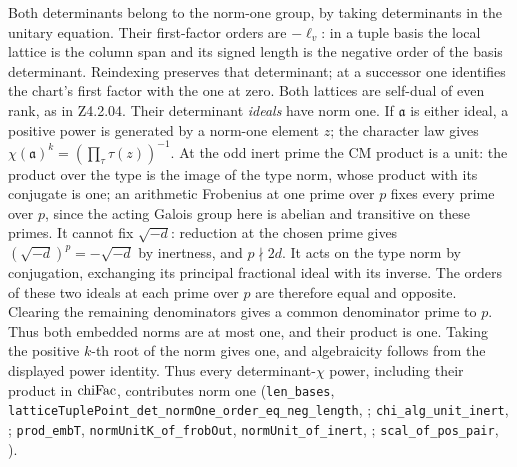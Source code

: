 Both determinants belong to the norm-one group, by taking determinants in the unitary equation. Their first-factor orders are \(-\ell_v\): in a tuple basis the local lattice is the column span and its signed length is the negative order of the basis determinant. Reindexing preserves that determinant; at a successor one identifies the chart's first factor with the one at zero. Both lattices are self-dual of even rank, as in Z4.2.04. Their determinant \emph{ideals} have norm one. If \(\mathfrak a\) is either ideal, a positive power is generated by a norm-one element \(z\); the character law gives \(\chi(\mathfrak a)^k=(\prod_\tau\tau(z))^{-1}\). At the odd inert prime the CM product is a unit: the product over the type is the image of the type norm, whose product with its conjugate is one; an arithmetic Frobenius at one prime over \(p\) fixes every prime over \(p\), since the acting Galois group here is abelian and transitive on these primes. It cannot fix \(\sqrt{-d}\): reduction at the chosen prime gives \((\sqrt{-d})^p=-\sqrt{-d}\) by inertness, and \(p\nmid2d\). It acts on the type norm by conjugation, exchanging its principal fractional ideal with its inverse. The orders of these two ideals at each prime over \(p\) are therefore equal and opposite. Clearing the remaining denominators gives a common denominator prime to \(p\). Thus both embedded norms are at most one, and their product is one. Taking the positive \(k\)-th root of the norm gives one, and algebraicity follows from the displayed power identity. Thus every determinant-\(\chi\) power, including their product in \({\rm chiFac}\), contributes norm one (\nolinkurl{len_bases}, \nolinkurl{latticeTuplePoint_det_normOne_order_eq_neg_length}, ; \nolinkurl{chi_alg_unit_inert}, ; \nolinkurl{prod_embT}, \nolinkurl{normUnitK_of_frobOut}, \nolinkurl{normUnit_of_inert}, ; \nolinkurl{scal_of_pos_pair}, ).

